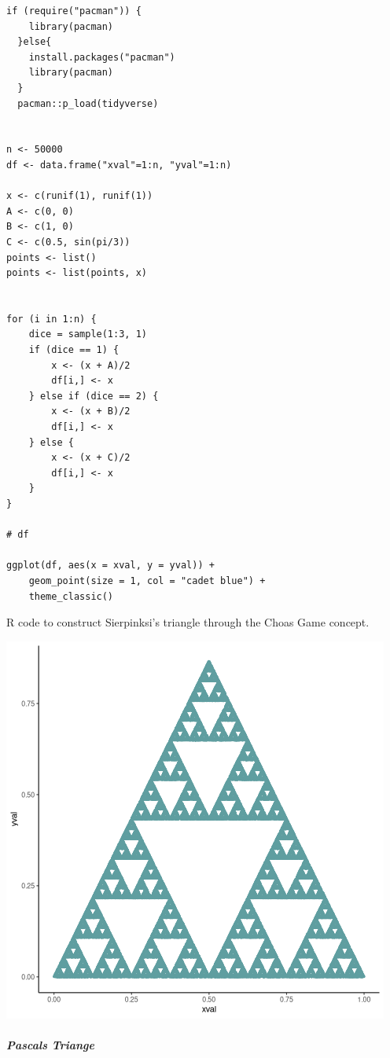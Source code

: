 \documentclass[11pt]{article}
\begin{document}
\begin{listing}[htbp]
\begin{verbatim}
if (require("pacman")) {
    library(pacman)
  }else{
    install.packages("pacman")
    library(pacman)
  }
  pacman::p_load(tidyverse)


n <- 50000
df <- data.frame("xval"=1:n, "yval"=1:n)

x <- c(runif(1), runif(1))
A <- c(0, 0)
B <- c(1, 0)
C <- c(0.5, sin(pi/3))
points <- list()
points <- list(points, x)


for (i in 1:n) {
    dice = sample(1:3, 1)
    if (dice == 1) {
        x <- (x + A)/2
        df[i,] <- x
    } else if (dice == 2) {
        x <- (x + B)/2
        df[i,] <- x
    } else {
        x <- (x + C)/2
        df[i,] <- x
    }
}

# df

ggplot(df, aes(x = xval, y = yval)) +
    geom_point(size = 1, col = "cadet blue") +
    theme_classic()

\end{verbatim}
\caption{R code to construct Sierpinksi's triangle through the Choas Game concept.}
\end{listing}


\begin{center}
\includegraphics[width=.9\linewidth]{pascal-sierpinsky-chaos-game.png}
\end{center}

\subparagraph{Pascals Triange}
\label{sec:org80c58dd}
\end{document}
